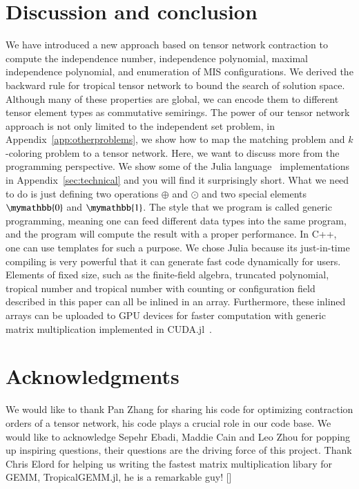 \documentclass[onefignum, onetabnum]{siamart190516}
\newcommand{\<}{\langle}
\renewcommand{\>}{\rangle}
\newcommand{\App}[1]{Appendix~\ref{#1}}
\newcommand{\blue}[1]{[{\bf  \color{blue}{JG: #1}}]}
\begin{document}
\section{Discussion and conclusion}
We have introduced a new approach based on tensor network contraction to compute the independence number, independence polynomial, maximal independence polynomial, and enumeration of MIS configurations.
We derived the backward rule for tropical tensor network to bound the search of solution space.
Although many of these properties are global, we can encode them to different tensor element types as commutative semirings.
The power of our tensor network approach is not only limited to the independent set problem, in \App{app:otherproblems}, we show how to map the matching problem and $k$-coloring problem to a tensor network.
Here, we want to discuss more from the programming perspective.
We show some of the Julia language~\cite{Bezanson2012} implementations in Appendix~\ref{sec:technical} and you will find it surprisingly short.
What we need to do is just defining two operations $\oplus$ and $\odot$ and two special elements $\mymathbb{0}$ and $\mymathbb{1}$.
The style that we program is called generic programming,
meaning one can feed different data types into the same program, and the program will compute the result with a proper performance.
In C++, one can use templates for such a purpose.
We chose Julia because its just-in-time compiling is very powerful that it can generate fast code dynamically for users.
Elements of fixed size, such as the finite-field algebra, truncated polynomial, tropical number and tropical number with counting or configuration field described in this paper can all be inlined in an array.
Furthermore, these inlined arrays can be uploaded to GPU devices for faster computation with generic matrix multiplication implemented in CUDA.jl~\cite{Besard2018}.

\section*{Acknowledgments}
We would like to thank Pan Zhang for sharing his code for optimizing contraction orders of a tensor network, his code plays a crucial role in our code base.
We would like to acknowledge Sepehr Ebadi, Maddie Cain and Leo Zhou for popping up inspiring questions,
their questions are the driving force of this project.
Thank Chris Elord for helping us writing the fastest matrix multiplication libary for GEMM, TropicalGEMM.jl, he is a remarkable guy!
\blue{funding information}
\end{document}
